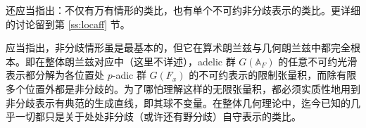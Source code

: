 还应当指出：不仅有万有情形的类比，也有单个不可约非分歧表示的类比。更详细的讨论留到第 \ref{ss:locaff} 节。

\begin{re}应当指出，非分歧情形虽是最基本的，但它在算术朗兰兹与几何朗兰兹中都完全根本。即在整体朗兰兹对应中（这里不详述），adelic 群 $G(\mathbb{A}_F)$ 的任意不可约光滑表示都分解为各位置处 $p$-adic 群 $G(F_x)$ 的不可约表示的限制张量积，而除有限多个位置外都是非分歧的。为了哪怕理解这样的无限张量积，都必须实质性地用到非分歧表示有典范的生成直线，即其球不变量。在整体几何理论中，迄今已知的几乎一切都只是关于处处非分歧（或许还有野分歧）自守表示的类比。
\end{re}
